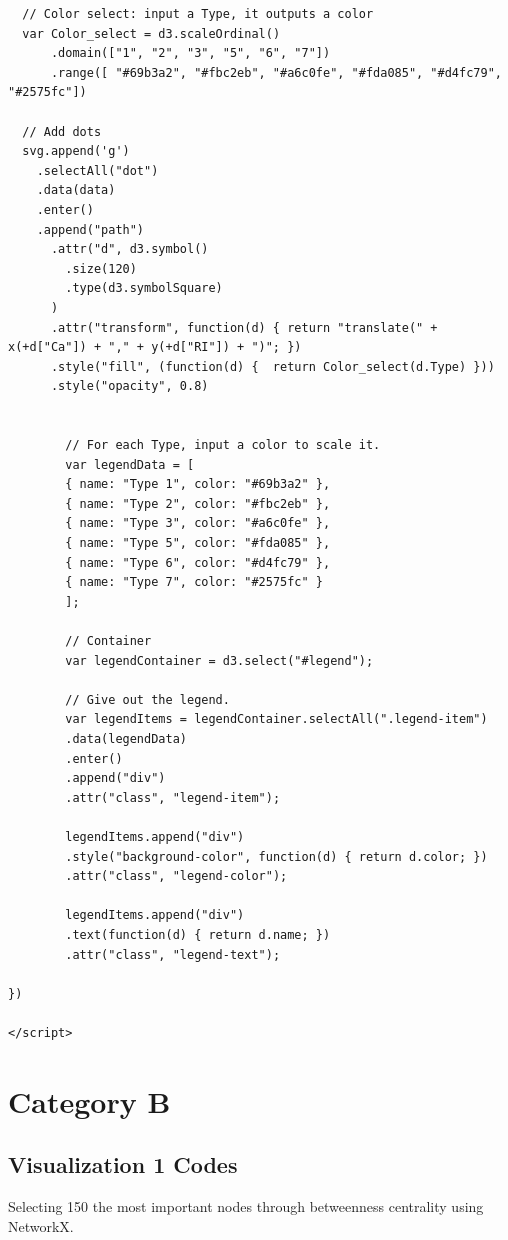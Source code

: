 \documentclass{article}
\begin{document}
\begin{lstlisting}
  // Color select: input a Type, it outputs a color
  var Color_select = d3.scaleOrdinal()
      .domain(["1", "2", "3", "5", "6", "7"])
      .range([ "#69b3a2", "#fbc2eb", "#a6c0fe", "#fda085", "#d4fc79", "#2575fc"])

  // Add dots
  svg.append('g')
    .selectAll("dot")
    .data(data)
    .enter()
    .append("path")
      .attr("d", d3.symbol()
        .size(120)
        .type(d3.symbolSquare)
      )
      .attr("transform", function(d) { return "translate(" + x(+d["Ca"]) + "," + y(+d["RI"]) + ")"; })
      .style("fill", (function(d) {  return Color_select(d.Type) }))
      .style("opacity", 0.8)


        // For each Type, input a color to scale it.
        var legendData = [
        { name: "Type 1", color: "#69b3a2" },
        { name: "Type 2", color: "#fbc2eb" },
        { name: "Type 3", color: "#a6c0fe" },
        { name: "Type 5", color: "#fda085" },
        { name: "Type 6", color: "#d4fc79" },
        { name: "Type 7", color: "#2575fc" }
        ];
        
        // Container
        var legendContainer = d3.select("#legend");
        
        // Give out the legend.
        var legendItems = legendContainer.selectAll(".legend-item")
        .data(legendData)
        .enter()
        .append("div")
        .attr("class", "legend-item");
        
        legendItems.append("div")
        .style("background-color", function(d) { return d.color; })
        .attr("class", "legend-color");
        
        legendItems.append("div")
        .text(function(d) { return d.name; })
        .attr("class", "legend-text");

})

</script>

\end{lstlisting}

\newpage

\section{Category B}

\subsection{Visualization 1 Codes}

Selecting 150 the most important nodes through betweenness centrality using NetworkX.
\end{document}
